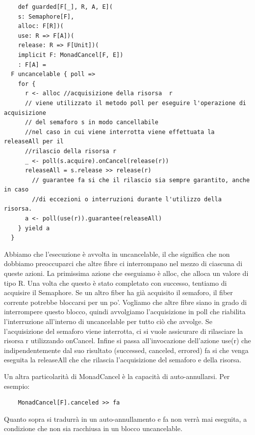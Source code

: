 \begin{verbatim}
    def guarded[F[_], R, A, E](
    s: Semaphore[F],
    alloc: F[R])(
    use: R => F[A])(
    release: R => F[Unit])(
    implicit F: MonadCancel[F, E])
    : F[A] =
  F uncancelable { poll =>
    for {
      r <- alloc //acquisizione della risorsa  r
      // viene utilizzato il metodo poll per eseguire l'operazione di acquisizione
      // del semaforo s in modo cancellabile
      //nel caso in cui viene interrotta viene effettuata la releaseAll per il
      //rilascio della risorsa r
      _ <- poll(s.acquire).onCancel(release(r)) 
      releaseAll = s.release >> release(r)
        // guarantee fa si che il rilascio sia sempre garantito, anche in caso 
        //di eccezioni o interruzioni durante l'utilizzo della risorsa.
      a <- poll(use(r)).guarantee(releaseAll)
    } yield a
  }
\end{verbatim}

\noindent Abbiamo che l'esecuzione è avvolta in uncancelable, il che significa che non dobbiamo preoccuparci che altre fibre ci interrompano nel mezzo di ciascuna di queste azioni. La primissima azione che eseguiamo è alloc, che alloca un valore di tipo R. Una volta che questo è stato completato con successo, tentiamo di acquisire il  Semaphore. Se un altro fiber ha già acquisito il
semaforo, il fiber corrente potrebbe bloccarsi per un po'. Vogliamo che altre fibre siano in grado di interrompere questo blocco, quindi avvolgiamo l'acquisizione in poll che riabilita l’interruzione all’interno di uncancelable per tutto ciò che avvolge. Se l’acquisizione del semaforo viene interrotta, ci si vuole assicurare di rilasciare la risorsa r utilizzando onCancel.  Infine si passa all’invocazione dell’azione use(r) che indipendentemente dal suo risultato (successed, canceled, errored) fa si che venga eseguita la releaseAll che che rilascia l’acquisizione del semaforo e della risorsa.

Un altra particolarità di MonadCancel è la capacità di auto-annullarsi. Per esempio:
\begin{verbatim}
    MonadCancel[F].canceled >> fa
\end{verbatim}

\noindent Quanto sopra si tradurrà in un auto-annullamento e fa non verrà mai eseguita, a condizione che non sia racchiusa in un blocco uncancelable.

